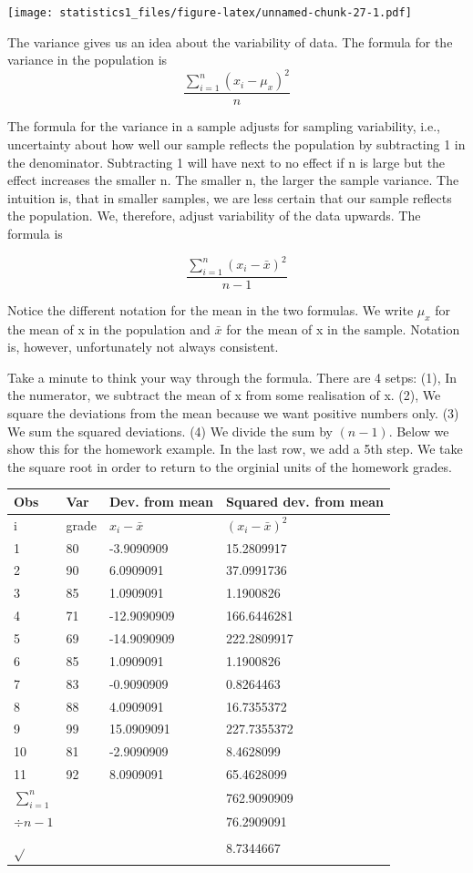 \documentclass[]{article}
\theoremstyle{definition}
\theoremstyle{definition}
\theoremstyle{definition}
\theoremstyle{remark}
\begin{document}
\texttt{[image: statistics1\_files/figure-latex/unnamed-chunk-27-1.pdf]}

The variance gives us an idea about the variability of data. The formula
for the variance in the population is
\[ \frac{\sum_{i=1}^n(x_i - \mu_x)^2}{n}\]

The formula for the variance in a sample adjusts for sampling
variability, i.e., uncertainty about how well our sample reflects the
population by subtracting 1 in the denominator. Subtracting 1 will have
next to no effect if n is large but the effect increases the smaller n.
The smaller n, the larger the sample variance. The intuition is, that in
smaller samples, we are less certain that our sample reflects the
population. We, therefore, adjust variability of the data upwards. The
formula is

\[ \frac{\sum_{i=1}^n(x_i - \bar{x})^2}{n-1}\]

Notice the different notation for the mean in the two formulas. We write
\(\mu_x\) for the mean of x in the population and \(\bar{x}\) for the
mean of x in the sample. Notation is, however, unfortunately not always
consistent.

Take a minute to think your way through the formula. There are 4 setps:
(1), In the numerator, we subtract the mean of x from some realisation
of x. (2), We square the deviations from the mean because we want
positive numbers only. (3) We sum the squared deviations. (4) We divide
the sum by \((n-1)\). Below we show this for the homework example. In
the last row, we add a 5th step. We take the square root in order to
return to the orginial units of the homework grades.

\begin{longtable}[]{@{}llll@{}}
\toprule
Obs & Var & Dev. from mean & Squared dev. from mean\tabularnewline
\midrule
\endhead
i & grade & \(x_i-\bar{x}\) & \((x_i-\bar{x})^2\)\tabularnewline
1 & 80 & -3.9090909 & 15.2809917\tabularnewline
2 & 90 & 6.0909091 & 37.0991736\tabularnewline
3 & 85 & 1.0909091 & 1.1900826\tabularnewline
4 & 71 & -12.9090909 & 166.6446281\tabularnewline
5 & 69 & -14.9090909 & 222.2809917\tabularnewline
6 & 85 & 1.0909091 & 1.1900826\tabularnewline
7 & 83 & -0.9090909 & 0.8264463\tabularnewline
8 & 88 & 4.0909091 & 16.7355372\tabularnewline
9 & 99 & 15.0909091 & 227.7355372\tabularnewline
10 & 81 & -2.9090909 & 8.4628099\tabularnewline
11 & 92 & 8.0909091 & 65.4628099\tabularnewline
\(\sum_{i=1}^n\) & & & 762.9090909\tabularnewline
\(\div n-1\) & & & 76.2909091\tabularnewline
\(\sqrt{}\) & & & 8.7344667\tabularnewline
\bottomrule
\end{longtable}
\end{document}
